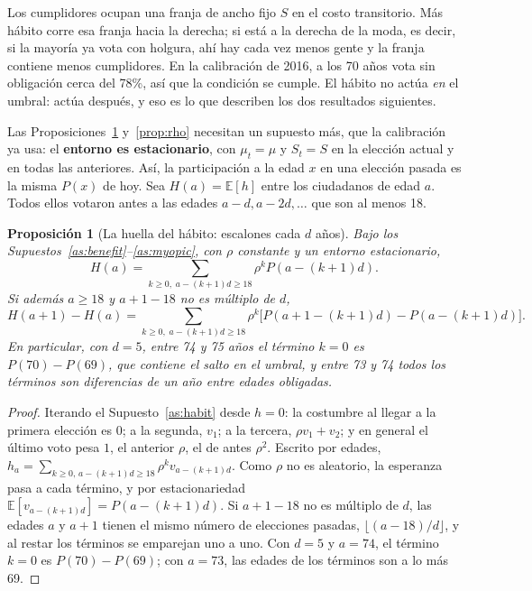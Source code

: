 \documentclass[11pt]{article}
\newtheorem{proposition}{Proposición}
\theoremstyle{definition}
\newcommand{\E}{\mathbb{E}}
\newcommand{\1}{\mathbbm{1}}
\begin{document}
Los cumplidores ocupan una franja de ancho fijo $S$ en el costo transitorio. Más hábito corre esa
franja hacia la derecha; si está a la derecha de la moda, es decir, si la mayoría ya vota con
holgura, ahí hay cada vez menos gente y la franja contiene menos cumplidores. En la calibración de 2016, a
los 70 años vota sin obligación cerca del 78\%, así que la condición se cumple. El hábito no actúa
\emph{en} el umbral: actúa después, y eso es lo que describen los dos resultados siguientes.

Las Proposiciones~\ref{prop:steps} y~\ref{prop:rho} necesitan un supuesto más, que la calibración
ya usa: el \textbf{entorno es estacionario}, con $\mu_t=\mu$ y $S_t=S$ en la elección actual y en
todas las anteriores. Así, la participación a la edad $x$ en una elección pasada es la misma $P(x)$
de hoy. Sea $H(a)=\E[h]$ entre los ciudadanos de edad $a$. Todos ellos votaron antes a las edades
$a-d,a-2d,\dots$ que son al menos 18.

\begin{proposition}[La huella del hábito: escalones cada $d$ años]\label{prop:steps}
Bajo los Supuestos~\ref{as:benefit}--\ref{as:myopic}, con $\rho$ constante y un entorno
estacionario,
\[
  H(a)=\sum_{k\ge0,\;a-(k+1)d\ge18}\rho^{k}P(a-(k+1)d).
\]
Si además $a\ge 18$ y $a+1-18$ no es múltiplo de $d$,
\[
  H(a+1)-H(a)=\sum_{k\ge0,\;a-(k+1)d\ge 18}\rho^{k}\bigl[P(a+1-(k+1)d)-P(a-(k+1)d)\bigr].
\]
En particular, con $d=5$, entre 74 y 75 años el término $k=0$ es $P(70)-P(69)$, que contiene el
salto en el umbral, y entre 73 y 74 todos los términos son diferencias de un año entre edades
obligadas.
\end{proposition}

\begin{proof}
Iterando el Supuesto~\ref{as:habit} desde $h=0$: la costumbre al llegar a la primera elección es
$0$; a la segunda, $v_1$; a la tercera, $\rho v_1+v_2$; y en general el último voto pesa $1$, el
anterior $\rho$, el de antes $\rho^2$. Escrito por edades,
$h_a=\sum_{k\ge0,\,a-(k+1)d\ge18}\rho^{k}v_{a-(k+1)d}$. Como $\rho$ no es aleatorio, la esperanza
pasa a cada término, y por estacionariedad $\E[v_{a-(k+1)d}]=P(a-(k+1)d)$. Si $a+1-18$ no es
múltiplo de $d$, las edades $a$ y $a+1$ tienen el mismo número de elecciones pasadas,
$\lfloor(a-18)/d\rfloor$, y al restar los términos se emparejan uno a uno. Con $d=5$ y $a=74$, el
término $k=0$ es $P(70)-P(69)$; con $a=73$, las edades de los términos son a lo más 69.
\end{proof}
\end{document}
